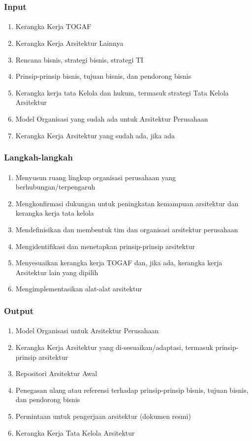 \documentclass[aspectratio=169, table]{beamer}
\begin{document}
	
	\begin{frame}
		\frametitle{Input}
		\framesubtitle{\hspace{1cm}}
		\begin{enumerate}
			\item Kerangka Kerja TOGAF
			\item Kerangka Kerja Arsitektur Lainnya
			\item Rencana bisnis, strategi bisnis, strategi TI
			\item Prinsip-prinsip bisnis, tujuan bisnis, dan pendorong bisnis
			\item Kerangka kerja tata Kelola dan hukum, termasuk strategi Tata Kelola Arsitektur
			\item Model Organisasi yang sudah ada untuk Arsitektur Perusahaan
			\item Kerangka Kerja Arsitektur yang sudah ada, jika ada
		\end{enumerate}
	\end{frame}
	
	\begin{frame}
		\frametitle{Langkah-langkah}
		\framesubtitle{\hspace{1cm}}
		\begin{enumerate}
			\item Menyusun ruang lingkup organisasi perusahaan yang berhubungan/terpengaruh
			\item Mengkonfirmasi dukungan untuk peningkatan kemampuan arsitektur dan kerangka kerja tata kelola
			\item Mendefinisikan dan membentuk tim dan organisasi arsitektur perusahaan
			\item Mengidentifikasi dan menetapkan prinsip-prinsip arsitektur
			\item Menyesuaikan kerangka kerja TOGAF dan, jika ada, kerangka kerja Arsitektur lain yang dipilih
			\item Mengimplementasikan alat-alat arsitektur
		\end{enumerate}
	\end{frame}
	
	\begin{frame}
		\frametitle{Output}
		\framesubtitle{\hspace{1cm}}
		\begin{enumerate}
			\item Model Organisasi untuk Arsitektur Perusahaan
			\item Kerangka Kerja Arsitektur yang di-sesuaikan/adaptasi, termasuk prinsip-prinsip arsitektur
			\item Repositori Arsitektur Awal
			\item Penegasan ulang atau referensi terhadap prinsip-prinsip bisnis, tujuan bisnis, dan pendorong bisnis
			\item Permintaan untuk pengerjaan arsitektur (dokumen resmi)
			\item Kerangka Kerja Tata Kelola Arsitektur
		\end{enumerate}
	\end{frame}
	
\end{document}
